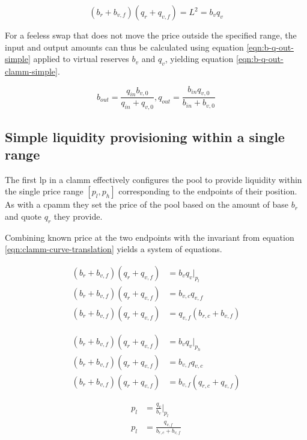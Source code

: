 \documentclass[table, twocolumn]{article}
\begin{document}
\begin{equation} \label{eqn:clamm-curve-translation}
  (b_r + b_{v, f})(q_r + q_{v, f}) = L^2 = b_v q_v
\end{equation}

For a feeless swap that does not move the price outside the specified range, the input
and output amounts can thus be calculated using equation \ref{eqn:b-q-out-simple}
applied to virtual reserves $b_v$ and $q_v$, yielding equation
\ref{eqn:b-q-out-clamm-simple}.

\begin{equation} \label{eqn:b-q-out-clamm-simple}
  b_{out} = \frac{q_{in} b_{v, 0}}{q_{in} + q_{v, 0}},
  q_{out} = \frac{b_{in} q_{v, 0}}{b_{in} + b_{v, 0}}
\end{equation}

\subsection{Simple liquidity provisioning within a single range}

The first \gls{lp} in a \gls{clamm} effectively configures the pool to provide liquidity
within the single price range $[p_l, p_h]$ corresponding to the endpoints of their
position. As with a \gls{cpamm} they set the price of the pool based on the amount of
base $b_r$ and quote $q_r$ they provide.

Combining known price at the two endpoints with the invariant from equation
\ref{eqn:clamm-curve-translation} yields a system of equations.

\begin{align} \label{eqn:sys-a}
  (b_r + b_{v, f})(q_r + q_{v, f}) & = b_v q_v |_{p_l} \nonumber      \\
  (b_r + b_{v, f})(q_r + q_{v, f}) & = b_{v, c} q_{v, f} \nonumber    \\
  (b_r + b_{v, f})(q_r + q_{v, f}) & = q_{v, f} (b_{r, c} + b_{v, f})
\end{align}

\begin{align} \label{eqn:sys-b}
  (b_r + b_{v, f})(q_r + q_{v, f}) & = b_v q_v |_{p_h} \nonumber      \\
  (b_r + b_{v, f})(q_r + q_{v, f}) & = b_{v, f} q_{v, c} \nonumber    \\
  (b_r + b_{v, f})(q_r + q_{v, f}) & = b_{v, f} (q_{r, c} + q_{v, f})
\end{align}

\begin{align} \label{eqn:sys-c}
  p_l & = \frac{q_v}{b_v}|_{p_l} \nonumber       \\
  p_l & = \frac{q_{v, f}}{b_{r, c} + {b_{v, f}}}
\end{align}
\end{document}
